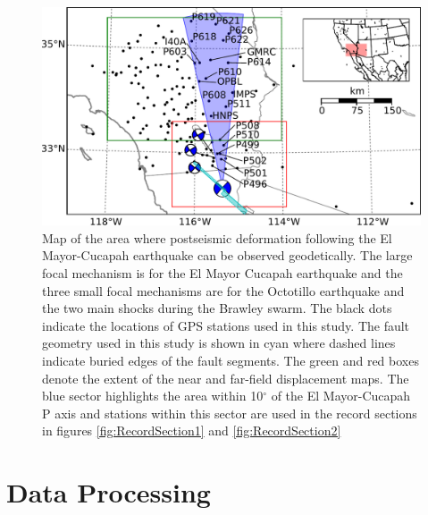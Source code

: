\documentclass[1p]{elsarticle}
\begin{document}
\begin{figure}
\includegraphics[scale=0.7]{Figures/ContextMap} 
\caption{Map of the area where postseismic deformation following the El Mayor-Cucapah earthquake can be observed geodetically. The large focal mechanism is for the El Mayor Cucapah earthquake and the three small focal mechanisms are for the Octotillo earthquake and the two main shocks during the Brawley swarm. The black dots indicate the locations of GPS stations used in this study.  The fault geometry used in this study is shown in cyan where dashed lines indicate buried edges of the fault segments.  The green and red boxes denote the extent of the near and far-field displacement maps.  The blue sector highlights the area within 10$^\circ$ of the El Mayor-Cucapah P axis and stations within this sector are used in the record sections in figures \ref{fig:RecordSection1} and \ref{fig:RecordSection2}}       
\label{fig:ContextMap}
\end{figure}

\section{Data Processing}\label{sec:Data}
\end{document}
